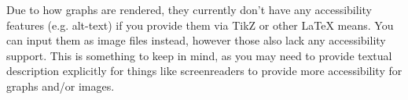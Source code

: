 \documentclass{ximera}
\begin{document}
Due to how graphs are rendered, they currently don't have any
accessibility features (e.g. alt-text) if you provide them via TikZ or other
LaTeX means. You can input them as image files instead, however those also lack
any accessibility support. This is something to keep in mind, as you may need
to provide textual description explicitly for things like screenreaders to
provide more accessibility for graphs and/or images.
\end{document}
